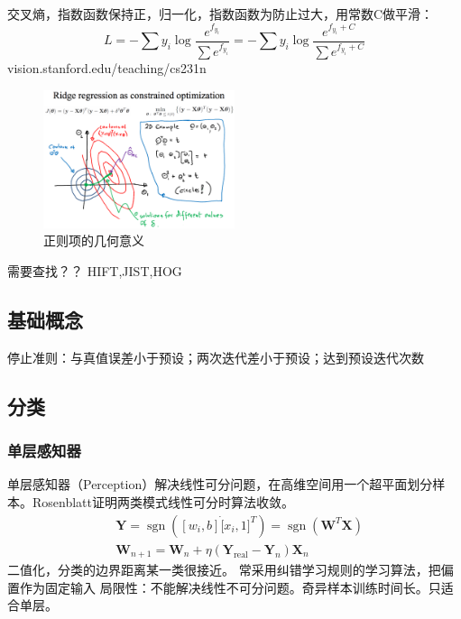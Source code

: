 \documentclass[UTF8]{../computerUniverse}
\DeclareMathOperator{\sgn}{sgn}
\begin{document}
交叉熵，指数函数保持正，归一化，指数函数为防止过大，用常数C做平滑：
\begin{equation}
L=-\sum y_i \log \frac{e^{f_{y_i}}}{\sum e^{f_{y_i}}}
=-\sum y_i \log \frac{e^{f_{y_i}+C}}{\sum e^{f_{y_i}+C}}
\end{equation}
vision.stanford.edu/teaching/cs231n


\begin{figure}[h]
    \centering
    \includegraphics[width=0.5\textwidth]{Figures/regulation.eps}
    \caption{正则项的几何意义}
\end{figure}




需要查找？？ HIFT,JIST,HOG

\subsection{基础概念}
停止准则：与真值误差小于预设；两次迭代差小于预设；达到预设迭代次数

\subsection{分类}
\subsubsection{单层感知器}
单层感知器（Perception）解决线性可分问题，在高维空间用一个超平面划分样本。Rosenblatt证明两类模式线性可分时算法收敛。
\begin{equation}
\label{perception}
\begin{split}
&\boldsymbol Y = \sgn \left( [w_i,b] \dot [x_i,1]^T \right)=\sgn(\boldsymbol W^T \boldsymbol X)\\
&\boldsymbol W_{n+1}=\boldsymbol W_n + \eta (\boldsymbol Y_{\text{real} } -\boldsymbol Y_n ) \boldsymbol X_n 
\end{split}
\end{equation}
二值化，分类的边界距离某一类很接近。
常采用纠错学习规则的学习算法，把偏置作为固定输入
局限性：不能解决线性不可分问题。奇异样本训练时间长。只适合单层。
\end{document}
